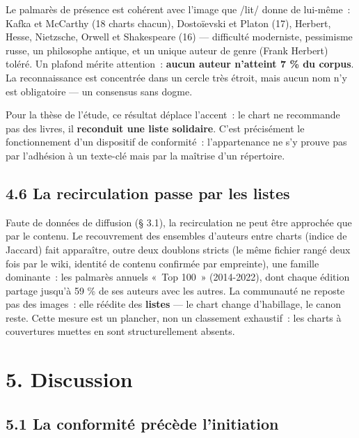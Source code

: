 \documentclass[11pt,a4paper]{article}
\begin{document}
Le palmarès de présence est cohérent avec l'image que /lit/ donne de lui-même~: Kafka et McCarthy (18 charts chacun), Dostoïevski et Platon (17), Herbert, Hesse, Nietzsche, Orwell et Shakespeare (16) --- difficulté moderniste, pessimisme russe, un philosophe antique, et un unique auteur de genre (Frank Herbert) toléré. Un plafond mérite attention~: \textbf{aucun auteur n'atteint 7 \% du corpus}. La reconnaissance est concentrée dans un cercle très étroit, mais aucun nom n'y est obligatoire --- un consensus sans dogme.

Pour la thèse de l'étude, ce résultat déplace l'accent~: le chart ne recommande pas des livres, il \textbf{reconduit une liste solidaire}. C'est précisément le fonctionnement d'un dispositif de conformité~: l'appartenance ne s'y prouve pas par l'adhésion à un texte-clé mais par la maîtrise d'un répertoire.

\subsection*{4.6 La recirculation passe par les listes}

Faute de données de diffusion (§ 3.1), la recirculation ne peut être approchée que par le contenu. Le recouvrement des ensembles d'auteurs entre charts (indice de Jaccard) fait apparaître, outre deux doublons stricts (le même fichier rangé deux fois par le wiki, identité de contenu confirmée par empreinte), une famille dominante~: les palmarès annuels «~Top 100~» (2014-2022), dont chaque édition partage jusqu'à 59 \% de ses auteurs avec les autres. La communauté ne reposte pas des images~: elle réédite des \textbf{listes} --- le chart change d'habillage, le canon reste. Cette mesure est un plancher, non un classement exhaustif~: les charts à couvertures muettes en sont structurellement absents.

\section*{5. Discussion}

\subsection*{5.1 La conformité précède l'initiation}
\end{document}
